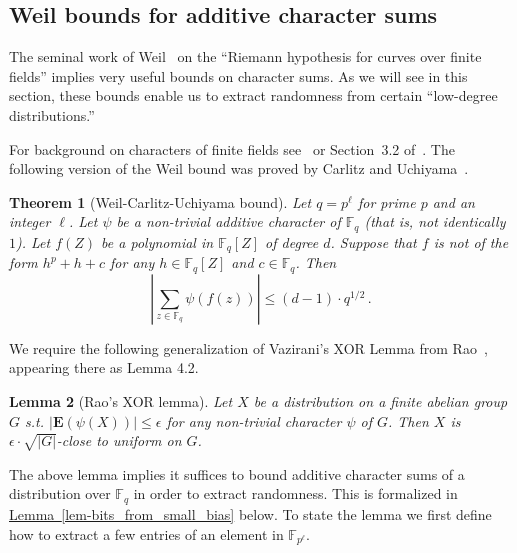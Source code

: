 \documentclass[10pt]{article}
\newtheorem{theorem}{Theorem}[section]
\newtheorem{lemma}[theorem]{Lemma}
\theoremstyle{definition}
\numberwithin{equation}{section}
\newcommand{\expref}[2]{\texorpdfstring{\hyperref[#2]{#1~\ref{#2}}}{#1~\ref{#2}}}
\newcommand{\eps}{\epsilon}
\newcommand{\F}{\mathbb F_q}
\newcommand{\Exp}{\mathbf{E}}
\begin{document}
\subsection{Weil bounds for additive character sums}\label{subsec:weil}
The seminal work of Weil~\cite{Weil48} on the ``Riemann hypothesis for
curves over finite fields'' implies very useful bounds on character
sums. As we will see in this section, these bounds enable us to
extract randomness from certain ``low-degree distributions.''

 For background on characters of finite fields see~\cite{Schmidt76} or Section~3.2 of~\cite{GR08}.
The following version of the Weil bound was proved by Carlitz and Uchiyama~\cite{CU57}.
\begin{theorem}[Weil-Carlitz-Uchiyama bound]\label{thm:weil_additive}
Let $q=p^{\ell}$ for prime $p$ and an integer $\ell$.
Let $\psi$ be a non-trivial additive character of $\F$ (that is,
not identically $1$). Let $f(Z)$ be a polynomial in $\F[Z]$ of
degree $d$. Suppose that $f$ is not of the form $h^p + h + c$ for any $h\in \F[Z]$ and $c\in \F$.
 Then
\[\left|\sum_{z\in \F} \psi(f(z))\right| \leq (d-1)\cdot q^{1/2}\,.\]
\end{theorem}

We require the following generalization of Vazirani's XOR Lemma from Rao~\cite{Rao07}, appearing there as Lemma 4.2.
\begin{lemma}[Rao's XOR lemma] \label{lem-rao}
Let $X$ be a distribution on a finite abelian group $G$ s.t.
$|\Exp(\psi(X))|\leq \eps$ for any non-trivial character
$\psi$ of $G$. Then $X$ is $\eps \cdot \sqrt {|G|}$-close to
uniform on $G$.
\end{lemma}

The above lemma implies it suffices to bound additive character sums of a distribution over $\F$ in order to extract randomness. This is formalized in \expref{Lemma}{lem-bits_from_small_bias} below. To state the lemma we first define how to extract a few entries of an element in $\mathbb{F}_{p^\ell}$.
\end{document}
